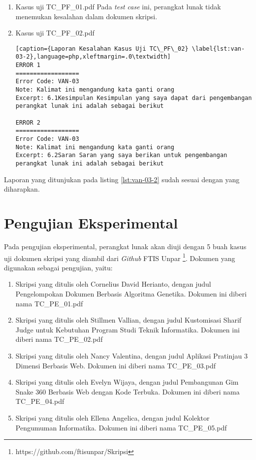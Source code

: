 \begin{enumerate}
	\item Kasus uji TC\_PF\_01.pdf
	Pada \textit{test case} ini, perangkat lunak tidak menemukan kesalahan dalam dokumen skripsi.
	
	\item Kasus uji TC\_PF\_02.pdf
	
\begin{lstlisting}[caption={Laporan Kesalahan Kasus Uji TC\_PF\_02}	\label{lst:van-03-2},language=php,xleftmargin=.0\textwidth]
ERROR 1
==================
Error Code: VAN-03
Note: Kalimat ini mengandung kata ganti orang
Excerpt: 6.1Kesimpulan Kesimpulan yang saya dapat dari pengembangan perangkat lunak ini adalah sebagai berikut

ERROR 2
==================
Error Code: VAN-03
Note: Kalimat ini mengandung kata ganti orang
Excerpt: 6.2Saran Saran yang saya berikan untuk pengembangan perangkat lunak ini adalah sebagai berikut
\end{lstlisting}
\end{enumerate}

Laporan yang ditunjukan pada listing \ref{lst:van-03-2} sudah sesuai dengan yang diharapkan.

\section{Pengujian Eksperimental}
Pada pengujian eksperimental, perangkat lunak akan diuji dengan 5 buah kasus uji dokumen skripsi yang diambil dari \textit{Github} FTIS Unpar \footnote{https://github.com/ftisunpar/Skripsi}. Dokumen yang digunakan sebagai pengujian, yaitu:

\begin{enumerate}
	\item Skripsi yang ditulis oleh Cornelius David Herianto, dengan judul Pengelompokan Dokumen Berbasis Algoritma Genetika. Dokumen ini diberi nama TC\_PE\_01.pdf~\cite{pe01}
	
	\item Skripsi yang ditulis oleh Stillmen Vallian, dengan judul Kustomisasi Sharif Judge untuk Kebutuhan Program Studi Teknik Informatika. Dokumen ini diberi nama TC\_PE\_02.pdf~\cite{pe02}
	
	\item Skripsi yang ditulis oleh Nancy Valentina, dengan judul Aplikasi Pratinjau 3 Dimensi Berbasis Web. Dokumen ini diberi nama TC\_PE\_03.pdf~\cite{pe03}
	
	\item Skripsi yang ditulis oleh Evelyn Wijaya, dengan judul Pembangunan Gim Snake 360 Berbasis Web dengan Kode Terbuka. Dokumen ini diberi nama TC\_PE\_04.pdf~\cite{pe04}
	
	\item Skripsi yang ditulis oleh Ellena Angelica, dengan judul Kolektor Pengumuman Informatika. Dokumen ini diberi nama TC\_PE\_05.pdf~\cite{pe05} 
	
\end{enumerate}

